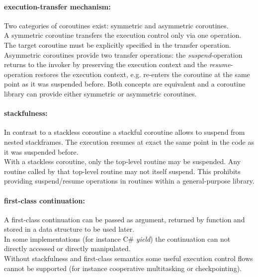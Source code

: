 \paragraph*{execution-transfer mechanism:}
Two categories of coroutines exist: symmetric and asymmetric coroutines.\\
\newline
A symmetric coroutine transfers the execution control only via one operation.
The target coroutine must be explicitly specified in the transfer operation.\\
\newline
Asymmetric coroutines provide two transfer operations:
the \textit{suspend}-operation returns to the invoker by preserving the
execution context  and the \textit{resume}-operation restores the execution
context, e.g. re-enters the coroutine at the same point as it was suspended
before.
Both concepts are equivalent and a coroutine library can provide either
symmetric or asymmetric coroutines\cite{Moura2009}.

\paragraph*{stackfulness:}
In contrast to a stackless coroutine a stackful coroutine allows to suspend
from nested stackframes. The execution resumes at exact the same point in the
code as it was suspended before.\\
With a stackless coroutine, only the top-level routine may be suspended. Any
routine called by that top-level routine may not itself suspend. This prohibits
providing suspend/resume operations in routines within a general-purpose library.

\paragraph*{first-class continuation:}
A first-class continuation can be passed as argument, returned by
function and stored in a data structure to be used later.\\
In some implementations (for instance C\# \textit{yield}) the continuation can
not directly accessed or directly manipulated.\\
\newline
Without stackfulness and first-class semantics some useful execution control
flows cannot be supported (for instance cooperative multitasking or
checkpointing).
